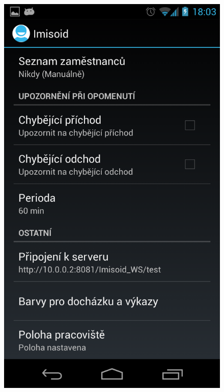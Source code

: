 \documentclass{diplomka}
\begin{document}
\begin{figure}[H]
\begin{minipage}{.45\textwidth}
 \includegraphics[width=.9\linewidth]{scr/settings2.png}
   \caption{}
  \label{fig:}
\end{minipage}
\end{figure}
\end{document}
